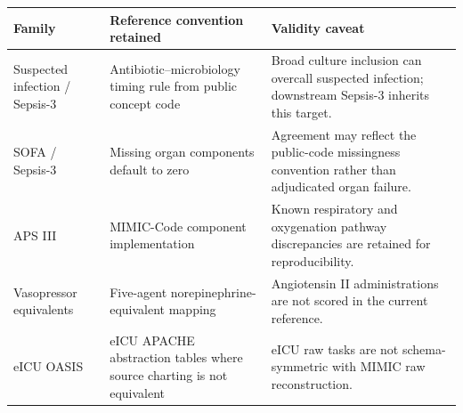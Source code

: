 \begin{tabular}{p{}p{}p{}}
\toprule
Family & Reference convention retained & Validity caveat \\
\midrule
Suspected infection / Sepsis-3 & Antibiotic--microbiology timing rule from public concept code & Broad culture inclusion can overcall suspected infection; downstream Sepsis-3 inherits this target. \\
SOFA / Sepsis-3 & Missing organ components default to zero & Agreement may reflect the public-code missingness convention rather than adjudicated organ failure. \\
APS III & MIMIC-Code component implementation & Known respiratory and oxygenation pathway discrepancies are retained for reproducibility. \\
Vasopressor equivalents & Five-agent norepinephrine-equivalent mapping & Angiotensin II administrations are not scored in the current reference. \\
eICU OASIS & eICU APACHE abstraction tables where source charting is not equivalent & eICU raw tasks are not schema-symmetric with MIMIC raw reconstruction. \\
\bottomrule
\end{tabular}
